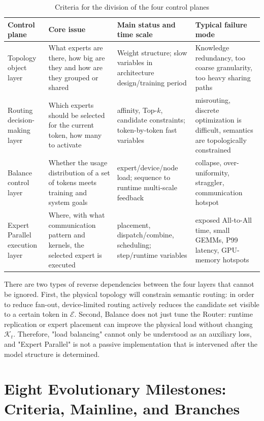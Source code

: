 \documentclass[10pt,a4paper,fontset=none]{ctexart}
\begin{document}
\begin{table}[htbp]
\centering
\caption{Criteria for the division of the four control planes}
\label{tab:fourplanes}
\small
\begin{tabularx}{\textwidth}{>{\raggedright\arraybackslash}p{}>{\raggedright\arraybackslash}p{}>{\raggedright\arraybackslash}p{}Y}
\toprule
Control plane & Core issue & Main status and time scale & Typical failure mode \\
\midrule
Topology object layer & What experts are there, how big are they and how are they grouped or shared & Weight structure; slow variables in architecture design/training period & Knowledge redundancy, too coarse granularity, too heavy sharing paths \\
Routing decision-making layer & Which experts should be selected for the current token, how many to activate & affinity, Top-$k$, candidate constraints; token-by-token fast variables & misrouting, discrete optimization is difficult, semantics are topologically constrained \\
Balance control layer & Whether the usage distribution of a set of tokens meets training and system goals & expert/device/node load; sequence to runtime multi-scale feedback & collapse, over-uniformity, straggler, communication hotspot \\
Expert Parallel execution layer & Where, with what communication pattern and kernels, the selected expert is executed & placement, dispatch/combine, scheduling; step/runtime variables & exposed All-to-All time, small GEMMs, P99 latency, GPU-memory hotspots \\
\bottomrule
\end{tabularx}
\end{table}

There are two types of reverse dependencies between the four layers that cannot be ignored. First, the physical topology will constrain semantic routing: in order to reduce fan-out, device-limited routing actively reduces the candidate set visible to a certain token in $\mathcal{E}$. Second, Balance does not just tune the Router: runtime replication or expert placement can improve the physical load without changing $\mathcal{K}_t$. Therefore, "load balancing" cannot only be understood as an auxiliary loss, and "Expert Parallel" is not a passive implementation that is intervened after the model structure is determined.

\section{Eight Evolutionary Milestones: Criteria, Mainline, and Branches}
\end{document}
